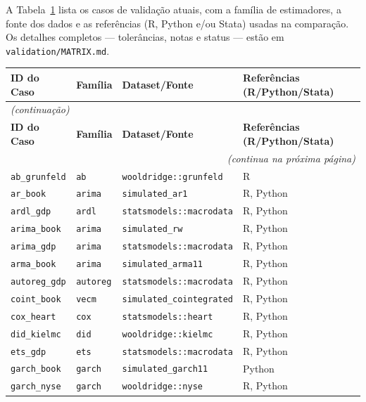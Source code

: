 A Tabela~\ref{tab:matriz_validacao} lista os casos de validação atuais, com a
família de estimadores, a fonte dos dados e as referências (R, Python e/ou
Stata) usadas na comparação. Os detalhes completos --- tolerâncias, notas e
status --- estão em \texttt{validation/MATRIX.md}.

{\footnotesize\setlength{\tabcolsep}{4pt}%
\begin{longtable}{llll}
\toprule
\label{tab:matriz_validacao}
\textbf{ID do Caso} & \textbf{Família} & \textbf{Dataset/Fonte} & \textbf{Referências (R/Python/Stata)} \\
\midrule
\endfirsthead
\multicolumn{4}{l}{\footnotesize\itshape (continuação)} \\[2pt]
\toprule
\textbf{ID do Caso} & \textbf{Família} & \textbf{Dataset/Fonte} & \textbf{Referências (R/Python/Stata)} \\
\midrule
\endhead
\midrule
\multicolumn{4}{r}{\footnotesize\itshape (continua na próxima página)} \\
\endfoot
\bottomrule
\endlastfoot
%
\texttt{ab\_grunfeld} & \texttt{ab} & \texttt{wooldridge::grunfeld} & R \\
\texttt{ar\_book} & \texttt{arima} & \texttt{simulated\_ar1} & R, Python \\
\texttt{ardl\_gdp} & \texttt{ardl} & \texttt{statsmodels::macrodata} & R, Python \\
\texttt{arima\_book} & \texttt{arima} & \texttt{simulated\_rw} & R, Python \\
\texttt{arima\_gdp} & \texttt{arima} & \texttt{statsmodels::macrodata} & R, Python \\
\texttt{arma\_book} & \texttt{arima} & \texttt{simulated\_arma11} & R, Python \\
\texttt{autoreg\_gdp} & \texttt{autoreg} & \texttt{statsmodels::macrodata} & R, Python \\
\texttt{coint\_book} & \texttt{vecm} & \texttt{simulated\_cointegrated} & R, Python \\
\texttt{cox\_heart} & \texttt{cox} & \texttt{statsmodels::heart} & R, Python \\
\texttt{did\_kielmc} & \texttt{did} & \texttt{wooldridge::kielmc} & R, Python \\
\texttt{ets\_gdp} & \texttt{ets} & \texttt{statsmodels::macrodata} & R, Python \\
\texttt{garch\_book} & \texttt{garch} & \texttt{simulated\_garch11} & Python \\
\texttt{garch\_nyse} & \texttt{garch} & \texttt{wooldridge::nyse} & R, Python \\

\end{longtable}}
